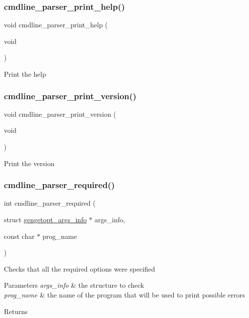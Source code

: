 \subsubsection{\texorpdfstring{cmdline\+\_\+parser\+\_\+print\+\_\+help()}{cmdline\_parser\_print\_help()}}
{\footnotesize\ttfamily void cmdline\+\_\+parser\+\_\+print\+\_\+help (\begin{DoxyParamCaption}\item[{void}]{ }\end{DoxyParamCaption})}

Print the help \mbox{\label{aes-getopt_8h_a96f27bf35ce0ab8eea7a1f6e6b59a5e2}} 
\subsubsection{\texorpdfstring{cmdline\+\_\+parser\+\_\+print\+\_\+version()}{cmdline\_parser\_print\_version()}}
{\footnotesize\ttfamily void cmdline\+\_\+parser\+\_\+print\+\_\+version (\begin{DoxyParamCaption}\item[{void}]{ }\end{DoxyParamCaption})}

Print the version \mbox{\label{aes-getopt_8h_a83651e5be280d60aed58fdb72456a030}} 
\subsubsection{\texorpdfstring{cmdline\+\_\+parser\+\_\+required()}{cmdline\_parser\_required()}}
{\footnotesize\ttfamily int cmdline\+\_\+parser\+\_\+required (\begin{DoxyParamCaption}\item[{struct \hyperlink{structgengetopt__args__info}{gengetopt\+\_\+args\+\_\+info} $\ast$}]{args\+\_\+info,  }\item[{const char $\ast$}]{prog\+\_\+name }\end{DoxyParamCaption})}

Checks that all the required options were specified 
\begin{DoxyParams}{Parameters}
{\em args\+\_\+info} & the structure to check \\
\hline
{\em prog\+\_\+name} & the name of the program that will be used to print possible errors \\
\hline
\end{DoxyParams}
\begin{DoxyReturn}{Returns}

\end{DoxyReturn}
